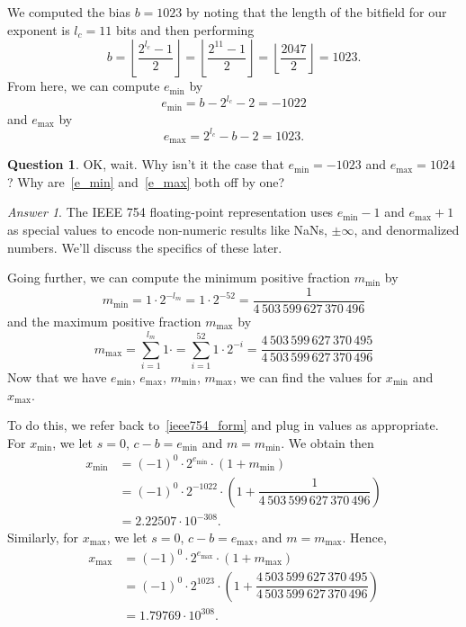 \documentclass[letterpaper,12pt]{article}
\theoremstyle{remark}
\newtheorem*{ansa}{Answer}
\theoremstyle{definition}
\newtheorem*{quea}{Question}
\begin{document}
We computed the bias $b=1023$ by noting that the length of the
bitfield for our exponent is $l_c=11$ bits and then performing
\begin{equation}
  b = \left \lfloor \dfrac{2^{l_c}-1}{2} \right \rfloor 
  = \left \lfloor \dfrac{2^{11}-1}{2} \right \rfloor
  = \left \lfloor \dfrac{2047}{2} \right \rfloor
  = 1023.
\end{equation}
From here, we can compute $e_{\mathrm{min}}$ by
\begin{equation}
  \label{e_min}
  e_{\mathrm{min}} = b - 2^{l_c} - 2 = -1022
\end{equation}
and $e_{\mathrm{max}}$ by
\begin{equation}
  \label{e_max}
  e_{\mathrm{max}} = 2^{l_c} - b - 2 = 1023.
\end{equation}
\begin{quea}
  OK, wait.  Why isn't it the case that $e_{\mathrm{min}}=-1023$ and
  $e_{\mathrm{max}}=1024$?  Why are~\eqref{e_min} and~\eqref{e_max}
  both off by one?
\end{quea}
\begin{ansa}
  The IEEE 754 floating-point representation uses $e_{\mathrm{min}}-1$
  and $e_{\mathrm{max}}+1$ as special values to encode non-numeric
  results like NaNs, $\pm\infty$, and denormalized numbers.  We'll
  discuss the specifics of these later.
\end{ansa}
Going further, we can compute the minimum positive fraction
$m_{\mathrm{min}}$ by
\begin{equation}
  m_{\mathrm{min}}=1\cdot 2^{-l_m}=1\cdot
  2^{-52}=\dfrac{1}{4\,503\,599\,627\,370\,496}
\end{equation}
and the maximum positive fraction $m_{\mathrm{max}}$ by
\begin{equation}
  m_{\mathrm{max}}=\sum_{i=1}^{l_m}1\cdot=\sum_{i=1}^{52}1\cdot
  2^{-i}=\dfrac{4\,503\,599\,627\,370\,495}{4\,503\,599\,627\,370\,496}
\end{equation}
Now that we have $e_{\mathrm{min}}$, $e_{\mathrm{max}}$,
$m_{\mathrm{min}}$, $m_{\mathrm{max}}$, we can find the values for
$x_{\mathrm{min}}$ and $x_{\mathrm{max}}$.

To do this, we refer back to~\eqref{ieee754_form} and plug in values
as appropriate.  For $x_{\mathrm{min}}$, we let $s=0$,
$c-b=e_{\mathrm{min}}$ and $m=m_{\mathrm{min}}$.  We obtain then
\begin{align}
  x_{\mathrm{min}} &= (-1)^0\cdot 2^{e_{\mathrm{min}}}\cdot (1 + m_{\mathrm{min}})\\
  &= (-1)^0\cdot 2^{-1022}\cdot (1 + \dfrac{1}{4\,503\,599\,627\,370\,496})\\
  &= 2.22507\cdot 10^{-308}.
\end{align}
Similarly, for $x_{\mathrm{max}}$, we let $s=0$,
$c-b=e_{\mathrm{max}}$, and $m=m_{\mathrm{max}}$.  Hence,
\begin{align}
  x_{\mathrm{max}} &=(-1)^0\cdot 2^{e_{\mathrm{max}}}\cdot (1 + m_{\mathrm{max}})\\
  &= (-1)^0\cdot 2^{1023}\cdot (1+
  \dfrac{4\,503\,599\,627\,370\,495}{4\,503\,599\,627\,370\,496})\\
  &= 1.79769\cdot 10^{308}.
\end{align}
\end{document}
